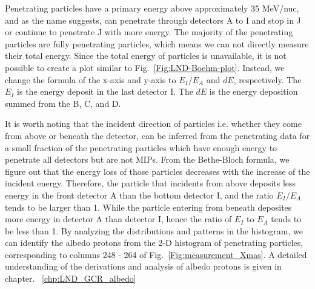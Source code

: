Penetrating particles have a primary energy above approximately 35 MeV/nuc, and as the name suggests, can penetrate through detectors A to I and stop in J or continue to penetrate J with more energy. The majority of the penetrating particles are fully penetrating particles, which means we can not directly measure their total energy. 
Since the total energy of particles is unavailable, it is not possible to create a plot similar to Fig.~\ref{Fig:LND-Boehm-plot}. Instead, we change the formula of the x-axis and y-axis to $E_I/E_A$ and $dE$, respectively. The $E_I$ is the energy deposit in the last detector I. The $dE$ is the energy deposition summed from the B, C, and D.

It is worth noting that the incident direction of particles i.e. whether they come from above or beneath the detector, can be inferred from the penetrating data for a small fraction of the penetrating particles which have enough energy to penetrate all detectors but are not \acp{MIP}. From the Bethe-Bloch formula, we figure out that the energy loss of those particles decreases with the increase of the incident energy. 
Therefore, the particle that incidents from above deposits less energy in the front detector A than the bottom detector I, and the ratio $E_I/E_A$ tends to be larger than 1. While the particle entering from beneath deposites more energy in detector A than detector I, hence the ratio of $E_I$ to $E_A$ tends to be less than 1. 
By analyzing the distributions and patterns in the histogram, we can identify the albedo protons from the 2-D histogram of penetrating particles, corresponding to columns 248 - 264 of Fig.~\ref{Fig:measurement_Xmas}.
A detailed understanding of the derivations and analysis of albedo protons is given in chapter. ~\ref{chp:LND_GCR_albedo}


